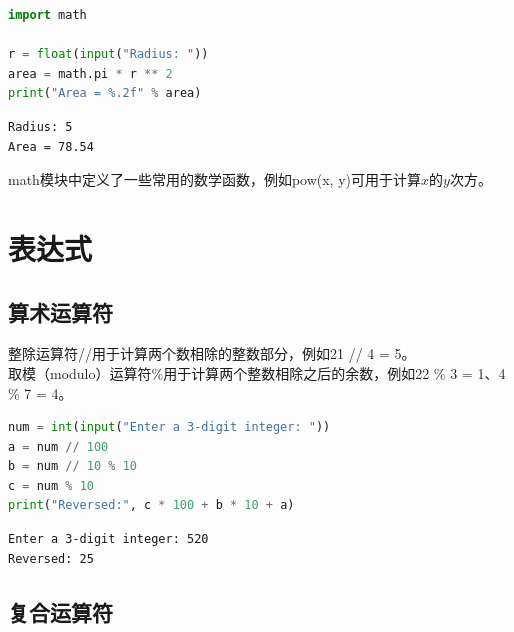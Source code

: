 
\begin{lstlisting}[language=Python]
import math

r = float(input("Radius: "))
area = math.pi * r ** 2
print("Area = %.2f" % area)
\end{lstlisting}

\begin{tcolorbox}
	\begin{verbatim}
Radius: 5
Area = 78.54
	\end{verbatim}
\end{tcolorbox}

math模块中定义了一些常用的数学函数，例如pow(x, y)可用于计算$ x $的$ y $次方。\\

\newpage

\section{表达式}

\subsection{算术运算符}

整除运算符//用于计算两个数相除的整数部分，例如21 // 4 = 5。\\

取模（modulo）运算符\%用于计算两个整数相除之后的余数，例如22 \% 3 = 1、4 \% 7 = 4。\\


\begin{lstlisting}[language=Python]
num = int(input("Enter a 3-digit integer: "))
a = num // 100
b = num // 10 % 10
c = num % 10
print("Reversed:", c * 100 + b * 10 + a)
\end{lstlisting}

\begin{tcolorbox}
	\begin{verbatim}
Enter a 3-digit integer: 520
Reversed: 25
	\end{verbatim}
\end{tcolorbox}

\vspace{0.5cm}

\subsection{复合运算符}

